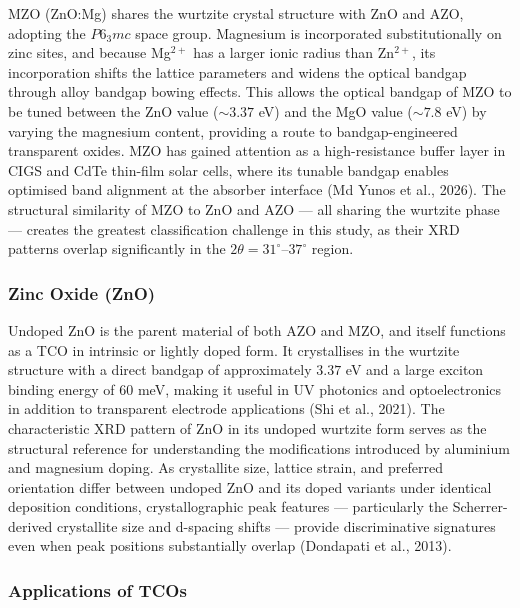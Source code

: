\documentclass[12pt, oneside]{article} %
\begin{document}
MZO (ZnO:Mg) shares the wurtzite crystal structure with ZnO and AZO, adopting the $P6_3mc$ space group. Magnesium is incorporated substitutionally on zinc sites, and because Mg$^{2+}$ has a larger ionic radius than Zn$^{2+}$, its incorporation shifts the lattice parameters and widens the optical bandgap through alloy bandgap bowing effects. This allows the optical bandgap of MZO to be tuned between the ZnO value ($\sim 3.37$ eV) and the MgO value ($\sim 7.8$ eV) by varying the magnesium content, providing a route to bandgap-engineered transparent oxides. MZO has gained attention as a high-resistance buffer layer in CIGS and CdTe thin-film solar cells, where its tunable bandgap enables optimised band alignment at the absorber interface (Md Yunos et al., 2026). The structural similarity of MZO to ZnO and AZO --- all sharing the wurtzite phase --- creates the greatest classification challenge in this study, as their XRD patterns overlap significantly in the $2\theta = 31^{\circ}$--$37^{\circ}$ region.


\subsubsection{Zinc Oxide (ZnO)}

Undoped ZnO is the parent material of both AZO and MZO, and itself functions as a TCO in intrinsic or lightly doped form. It crystallises in the wurtzite structure with a direct bandgap of approximately $3.37$ eV and a large exciton binding energy of $60$ meV, making it useful in UV photonics and optoelectronics in addition to transparent electrode applications (Shi et al., 2021). The characteristic XRD pattern of ZnO in its undoped wurtzite form serves as the structural reference for understanding the modifications introduced by aluminium and magnesium doping. As crystallite size, lattice strain, and preferred orientation differ between undoped ZnO and its doped variants under identical deposition conditions, crystallographic peak features --- particularly the Scherrer-derived crystallite size and d-spacing shifts --- provide discriminative signatures even when peak positions substantially overlap (Dondapati et al., 2013).


\subsubsection{Applications of TCOs}
\end{document}
